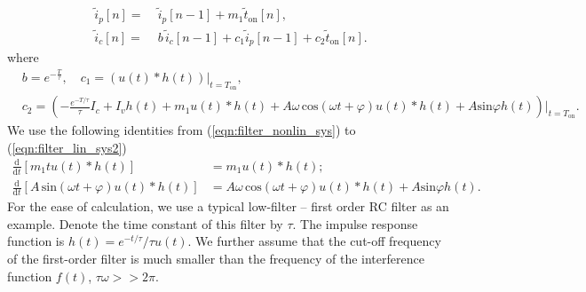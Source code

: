 \begin{align} \label{eqn:filter_lin_sys2}
\tilde i_p[n] = \; & \tilde i_p[n-1]  +m_1 \tilde t_{\text{on}}[n], \nonumber \\
\tilde i_c [n] = \; & b \,\tilde i_c [n-1] +  c_1  \tilde i_p [n-1] +  c_2 \tilde t_{\text{on}}[n].
\end{align}
where 
\begin{align}
    &b = e^{-\frac{T}{\tau}}, \quad c_1 = \left(u(t) * h(t)\right)\bigg\rvert_{t = T_{\text{on}}}, \nonumber \\
    & c_2 = \left( -\frac{e^{-T/\tau}}{\tau} I_c + I_v h(t) + m_1 u(t)* h(t) + A \omega\,  \text{cos}(\omega  t+\varphi) u(t) * h(t) + A\text{sin}\varphi h(t) \right)\bigg\rvert_{t = T_{\text{on}}}.
\end{align}
We use the following identities from (\ref{eqn:filter_nonlin_sys}) to (\ref{eqn:filter_lin_sys2})
\begin{align}
     \frac{\text{d}}{\text{d} t} [m_1t u(t)*h(t)] &= m_1 u(t)*h(t); \nonumber \\
     \frac{\text{d}}{\text{d} t} [A \, \text{sin} (\omega t+\varphi) u(t)*h(t)] &= A \omega\, \text{cos}(\omega  t+\varphi) u(t) * h(t) + A\text{sin}\varphi h(t).
\end{align}
For the ease of calculation, we use a typical low-filter -- first order RC filter as an example. Denote the time constant of this filter by $\tau$. The impulse response function is $ h(t) = e^{-t/\tau}/\tau u(t)$. We further assume that the cut-off frequency of the first-order filter is much smaller than the frequency of the interference function $f(t)$, $\tau \omega >> 2 \pi$.

